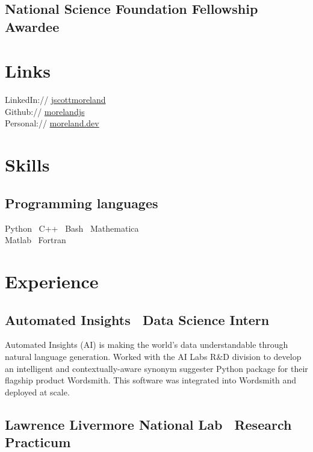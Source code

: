 \documentclass[letterpaper,10pt]{article}
\begin{document}
\begin{multicols}{2}
\subsection{National Science Foundation Fellowship Awardee}

\section{Links}

LinkedIn:// \href{https://www.linkedin.com/in/jscottmoreland/}{jscottmoreland}\\[1ex]
Github:// \href{https://github.com/morelandjs}{morelandjs}\\[1ex]
Personal:// \href{https://moreland.dev}{moreland.dev}\\

\section{Skills}

\subsection{Programming languages}

Python \textbullet\ C++ \textbullet\ Bash \textbullet\ Mathematica \hfill \\
Matlab \textbullet\ Fortran \hfill\\

\columnbreak

\section{Experience}

\subsection{Automated Insights \textbar\ Data Science Intern}

Automated Insights (AI) is making the world's data understandable through natural language generation. Worked with the AI Labs R\&D division to develop an intelligent and contextually-aware synonym suggester Python package for their flagship product Wordsmith. This software was integrated into Wordsmith and deployed at scale.

\subsection{Lawrence Livermore National Lab \textbar\ Research Practicum}


\end{multicols}
\end{document}

